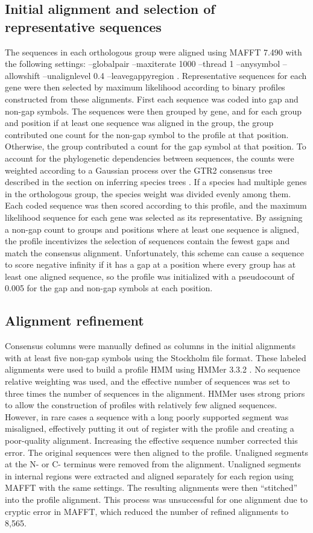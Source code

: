 \documentclass[10pt,letterpaper]{article}
\begin{document}
\subsection*{Initial alignment and selection of representative sequences}
The sequences in each orthologous group were aligned using MAFFT 7.490 with the following settings: --globalpair --maxiterate 1000 --thread 1 --anysymbol --allowshift --unalignlevel 0.4 --leavegappyregion \cite{Katoh2013}. Representative sequences for each gene were then selected by maximum likelihood according to binary profiles constructed from these alignments. First each sequence was coded into gap and non-gap symbols. The sequences were then grouped by gene, and for each group and position if at least one sequence was aligned in the group, the group contributed one count for the non-gap symbol to the profile at that position. Otherwise, the group contributed a count for the gap symbol at that position. To account for the phylogenetic dependencies between sequences, the counts were weighted according to a Gaussian process over the GTR2 consensus tree described in the section on inferring species trees \cite{Altschul1989}. If a species had multiple genes in the orthologous group, the species weight was divided evenly among them. Each coded sequence was then scored according to this profile, and the maximum likelihood sequence for each gene was selected as its representative. By assigning a non-gap count to groups and positions where at least one sequence is aligned, the profile incentivizes the selection of sequences contain the fewest gaps and match the consensus alignment. Unfortunately, this scheme can cause a sequence to score negative infinity if it has a gap at a position where every group has at least one aligned sequence, so the profile was initialized with a pseudocount of 0.005 for the gap and non-gap symbols at each position.

\subsection*{Alignment refinement}
Consensus columns were manually defined as columns in the initial alignments with at least five non-gap symbols using the Stockholm file format. These labeled alignments were used to build a profile HMM using HMMer 3.3.2 \cite{Eddy2009}. No sequence relative weighting was used, and the effective number of sequences was set to three times the number of sequences in the alignment. HMMer uses strong priors to allow the construction of profiles with relatively few aligned sequences. However, in rare cases a sequence with a long poorly supported segment was misaligned, effectively putting it out of register with the profile and creating a poor-quality alignment. Increasing the effective sequence number corrected this error. The original sequences were then aligned to the profile. Unaligned segments at the N- or C- terminus were removed from the alignment. Unaligned segments in internal regions were extracted and aligned separately for each region using MAFFT with the same settings. The resulting alignments were then “stitched” into the profile alignment. This process was unsuccessful for one alignment due to cryptic error in MAFFT, which reduced the number of refined alignments to 8,565.
\end{document}
